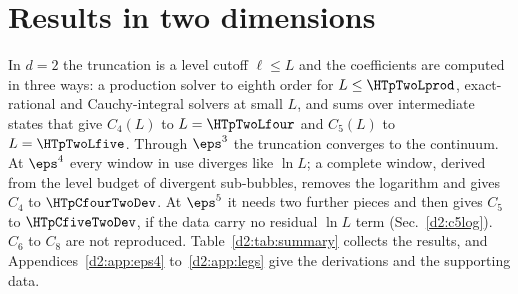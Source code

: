 \section{Results in two dimensions}\label{d2:sec}

In $d=2$ the truncation is a level cutoff $\ell\le L$ and the coefficients are computed in three ways: a production solver
to eighth order for $L\le\HTpTwoLprod$, exact-rational and Cauchy-integral solvers at small $L$, and sums over intermediate
states that give $C_4(L)$ to $L=\HTpTwoLfour$ and $C_5(L)$ to $L=\HTpTwoLfive$. Through $\eps^3$ the truncation converges to the
continuum. At $\eps^4$ every window in use diverges like $\ln L$; a complete window, derived from the level budget of
divergent sub-bubbles, removes the logarithm and gives $C_4$ to $\HTpCfourTwoDev$. At $\eps^5$ it needs two further pieces
and then gives $C_5$ to $\HTpCfiveTwoDev$, if the data carry no residual $\ln L$ term (Sec.~\ref{d2:c5log}). $C_6$ to $C_8$ are not reproduced. Table~\ref{d2:tab:summary} collects the results, and Appendices~\ref{d2:app:eps4} to~\ref{d2:app:legs} give the derivations and the supporting data.

